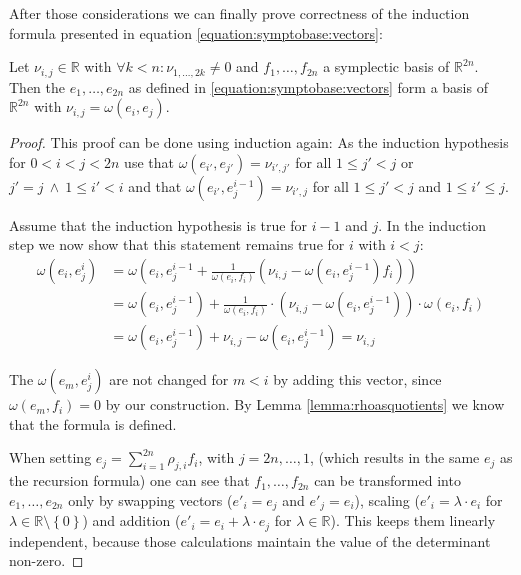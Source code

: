 \documentclass[../SymplecticSimplices.tex]{subfiles}
\begin{document}
After those considerations we can finally prove correctness of the induction formula presented in equation \eqref{equation:symptobase:vectors}:

\begin{lemma}
  \label{lemma:correctnessofrecursionformula}
  Let \( \nu_{i,j} \in \mathbb{R} \) with \( \forall k < n : \nu_{1,\dots,2k } \neq 0 \) and \( f_1, \dots, f_{2n} \) a symplectic basis of \( \mathbb{R}^{2n} \).\\
  Then the \( e_1, \dots, e_{2n} \) as defined in \eqref{equation:symptobase:vectors} form a basis of \( \mathbb{R}^{2n} \) with \( \nu_{i,j} = \omega\left(e_i, e_j\right) \).
\end{lemma}

\begin{proof}
  This proof can be done using induction again: As the induction hypothesis for \( 0 < i < j < 2n \) use that \( \omega \left( e_{i'}, e_{j'} \right) = \nu_{i',j'} \) for all \( 1 \leq j' < j \) or \( j' = j \: \land \: 1 \leq i' < i \) and that \( \omega \left( e_{i'}, e_j^{i-1} \right) = \nu_{i', j} \) for all \( 1 \leq j' < j \) and \( 1 \leq i' \leq j \).

  Assume that the induction hypothesis is true for \( i - 1 \) and \( j \). In the induction step we now show that this statement remains true for \( i \) with \( i < j \):
\begin{align*}
  \omega \left( e_i, e_j^i \right) & = \omega \left( e_i, e_j^{i-1} + \frac{1}{\omega \left( e_i, f_i \right)} \left( \nu_{i,j} - \omega \left( e_i, e_j^{i-1} \right) f_i \right) \right) \\
                                   & = \omega \left( e_i, e_j^{i-1} \right) + \frac{1}{\omega \left( e_i, f_i \right)} \cdot \left( \nu_{i,j} - \omega \left( e_i, e_j^{i-1} \right) \right) \cdot \omega \left( e_i, f_i \right) \\
                                   & = \omega \left( e_i, e_j^{i-1} \right) + \nu_{i,j} - \omega \left( e_i, e_j^{i-1} \right) = \nu_{i,j}
\end{align*}

The \( \omega \left( e_m, e_j^i \right) \) are not changed for \( m < i \) by adding this vector, since \( \omega \left( e_m, f_i \right) = 0 \) by our construction. By Lemma \ref{lemma:rhoasquotients} we know that the formula is defined.

When setting \( e_j = \sum_{i=1}^{2n} \rho_{j, i} f_i \), with \( j = 2n, \dots, 1 \), (which results in the same \( e_j \) as the recursion formula) one can see that \( f_1, \dots, f_{2n} \) can be transformed into \( e_1, \dots, e_{2n} \) only by swapping vectors (\( e'_i = e_j \) and \(e'_j = e_i\)), scaling (\( e'_i = \lambda \cdot e_i \) for \( \lambda \in \mathbb{R} \setminus \left\lbrace 0 \right\rbrace \)) and addition (\( e'_i = e_i + \lambda \cdot e_j\) for \(  \lambda \in \mathbb{R} \)). This keeps them linearly independent, because those calculations maintain the value of the determinant non-zero.
\end{proof}
\end{document}
